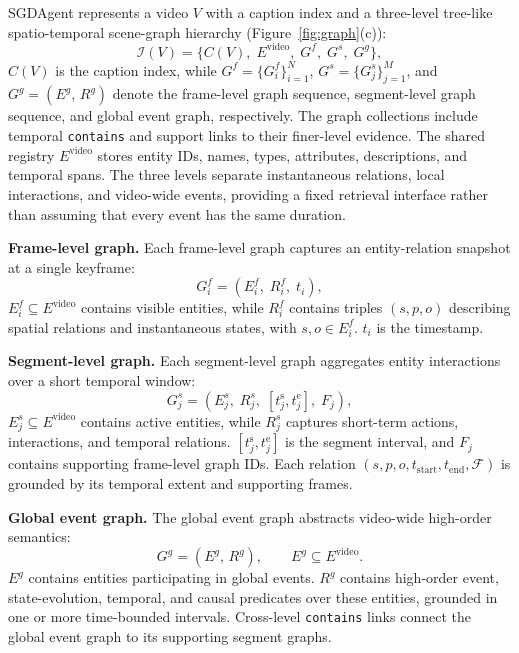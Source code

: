 \documentclass[11pt]{article}
\begin{document}
SGDAgent represents a video $V$ with a caption index and a three-level tree-like spatio-temporal scene-graph hierarchy (Figure~\ref{fig:graph}(c)):
\begin{equation}
  \mathcal{I}(V) = \bigl\{C(V),\; E^{\mathrm{video}},\; G^{f},\; G^{s},\; G^{g}\bigr\},
\end{equation}
$C(V)$ is the caption index, while $G^{f}=\{G_i^{f}\}_{i=1}^{N}$, $G^{s}=\{G_j^{s}\}_{j=1}^{M}$, and $G^{g}=(E^{g},\,R^{g})$ denote the frame-level graph sequence, segment-level graph sequence, and global event graph, respectively.
The graph collections include temporal \texttt{contains} and support links to their finer-level evidence.
The shared registry $E^{\mathrm{video}}$ stores entity IDs, names, types, attributes, descriptions, and temporal spans.
The three levels separate instantaneous relations, local interactions, and video-wide events, providing a fixed retrieval interface rather than assuming that every event has the same duration.

\textbf{Frame-level graph.}
Each frame-level graph captures an entity-relation snapshot at a single keyframe:
\begin{equation}
  G_i^{f} = (E_i^{f},\; R_i^{f},\; t_i),
\end{equation}
$E_i^{f} \subseteq E^{\mathrm{video}}$ contains visible entities, while $R_i^{f}$ contains triples $(s,p,o)$ describing spatial relations and instantaneous states, with $s,o \in E_i^{f}$.
$t_i$ is the timestamp.

\textbf{Segment-level graph.}
Each segment-level graph aggregates entity interactions over a short temporal window:
\begin{equation}
  G_j^{s} = (E_j^{s},\; R_j^{s},\;
  [t_j^{\mathrm{s}}, t_j^{\mathrm{e}}],\; F_j),
\end{equation}
$E_j^{s} \subseteq E^{\mathrm{video}}$ contains active entities, while $R_j^{s}$ captures short-term actions, interactions, and temporal relations.
$[t_j^{\mathrm{s}},t_j^{\mathrm{e}}]$ is the segment interval, and $F_j$ contains supporting frame-level graph IDs.
Each relation $(s,p,o,t_{\mathrm{start}},t_{\mathrm{end}},\mathcal{F})$ is grounded by its temporal extent and supporting frames.

\textbf{Global event graph.}
The global event graph abstracts video-wide high-order semantics:
\begin{equation}
  G^{g}=(E^{g},\,R^{g}), \qquad E^{g}\subseteq E^{\mathrm{video}}.
\end{equation}
$E^{g}$ contains entities participating in global events.
$R^{g}$ contains high-order event, state-evolution, temporal, and causal predicates over these entities, grounded in one or more time-bounded intervals.
Cross-level \texttt{contains} links connect the global event graph to its supporting segment graphs.
\end{document}
